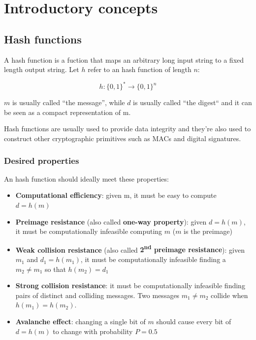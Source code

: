 \section{Introductory concepts}

\subsection{Hash functions}
A hash function is a fuction that maps an arbitrary long input string to a fixed
length output string. Let $h$ refer to an hash function of length $n$:

\[
  h\colon \{0,1\}^* \to \{0,1\}^n
\]

$m$ is usually called ``the message'', while $d$ is usually called ``the digest``
and it can be seen as a compact representation of m. 

Hash functions are usually used to provide data integrity and they're also used to
construct other cryptographic primitives such as MACs and digital signatures.

\subsubsection{Desired properties}
An hash function should ideally meet these properties:
\begin{itemize}
  \item \textbf{Computational efficiency}: given m, it must be easy to compute ${d=h(m)}$
  \item \textbf{Preimage resistance} (also called \textbf{one-way property}):
  given ${d=h(m)}$, it must be computationally infeasible computing $m$ ($m$ is the
  preimage)
  \item \textbf{Weak collision resistance} (also called
  \textbf{2\textsuperscript{nd} preimage resistance}): given $m_1$ and ${d_1=h(m_1)}$,
  it must be computationally infeasible finding a $m_2 \neq m_1$ so that ${h(m_2)=d_1}$
  \item \textbf{Strong collision resistance}: it must be computationally infeasible
  finding pairs of distinct and colliding messages. Two messages $m_1\neq m_2$
  collide when ${h(m_1)=h(m_2)}$.
  \item \textbf{Avalanche effect}: changing a single bit of $m$ should cause every
  bit of ${d=h(m)}$ to change with probability ${P=0.5}$
\end{itemize}

